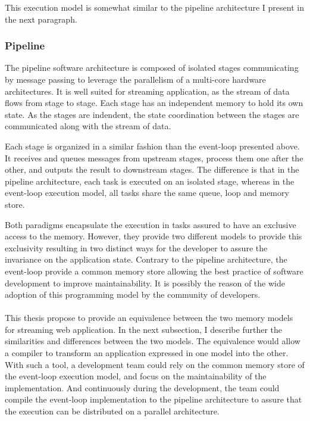This execution model is somewhat similar to the pipeline architecture I present in the next paragraph.

\subsubsection{Pipeline}

The pipeline software architecture is composed of isolated stages communicating by message passing to leverage the parallelism of a multi-core hardware architectures.
It is well suited for streaming application, as the stream of data flows from stage to stage.
Each stage has an independent memory to hold its own state.
As the stages are indendent, the state coordination between the stages are communicated along with the stream of data.


Each stage is organized in a similar fashion than the event-loop presented above.
It receives and queues messages from upstream stages, process them one after the other, and outputs the result to downstream stages.
The difference is that in the pipeline architecture, each task is executed on an isolated stage, whereas in the event-loop execution model, all tasks share the same queue, loop and memory store.

Both paradigms encapsulate the execution in tasks assured to have an exclusive access to the memory.
However, they provide two different models to provide this exclusivity resulting in two distinct ways for the developer to assure the invariance on the application state.
Contrary to the pipeline architecture, the event-loop provide a common memory store allowing the best practice of software development to improve maintainability.
It is possibly the reason of the wide adoption of this programming model by the community of developers.

\paragraph{}

This thesis propose to provide an equivalence between the two memory models for streaming web application.
In the next subsection, I describe further the similarities and differences between the two models.
The equivalence would allow a compiler to transform an application expressed in one model into the other.
With such a tool, a development team could rely on the common memory store of the event-loop execution model, and focus on the maintainability of the implementation.
And continuously during the development, the team could compile the event-loop implementation to the pipeline architecture to assure that the execution can be distributed on a parallel architecture.

